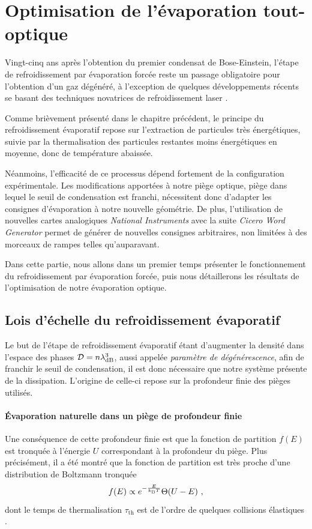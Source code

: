 \section{Optimisation de l'évaporation tout-optique}
\label{sc:evap_optique}
Vingt-cinq ans après l'obtention du premier condensat de Bose-Einstein, l'étape de refroidissement par évaporation forcée reste un passage obligatoire pour l'obtention d'un gaz dégénéré, à l'exception de quelques développements récents se basant des techniques novatrices de refroidissement laser \citep{stellmer2013laser} \citep{hu2017creation}. 

Comme brièvement présenté dans le chapitre précédent, le principe du refroidissement évaporatif repose sur l'extraction de particules très énergétiques, suivie par la thermalisation des particules restantes moins énergétiques en moyenne, donc de température abaissée.

Néanmoins, l'efficacité de ce processus dépend fortement de la configuration expérimentale. Les modifications apportées à notre piège optique, piège dans lequel le seuil de condensation est franchi, nécessitent donc d'adapter les consignes d'évaporation à notre nouvelle géométrie. De plus, l'utilisation de nouvelles cartes analogiques \emph{National Instruments} avec la suite \emph{Cicero Word Generator} permet de générer de nouvelles consignes arbitraires, non limitées à des morceaux de rampes telles qu'auparavant. 

Dans cette partie, nous allons dans un premier temps présenter le fonctionnement du refroidissement par évaporation forcée, puis nous détaillerons les résultats de l'optimisation de notre évaporation optique.


\subsection{Lois d'échelle du refroidissement évaporatif}
Le but de l'étape de refroidissement évaporatif étant d'augmenter la densité dans l'espace des phases $\mathcal{D}=n \lambda_{\mathrm{dB}}^3$, aussi appelée \emph{paramètre de dégénérescence}, afin de franchir le seuil de condensation, il est donc nécessaire que notre système présente de la dissipation. L'origine de celle-ci repose sur la profondeur finie des pièges utilisés.  

\paragraph*{Évaporation naturelle dans un piège de profondeur finie}
Une conséquence de cette profondeur finie est que la fonction de partition $f(E)$ est tronquée à l'énergie $U$ correspondant à la profondeur du piège. Plus précisément, il a été montré que la fonction de partition est très proche d'une distribution de Boltzmann tronquée
\begin{equation}
f(E)\propto e^{-\frac{E}{k_{\mathrm{B}} T}} \Theta(U-E) \text{ ,}
\label{eq:fonction_partition}
\end{equation}
dont le temps de thermalisation $\tau_{\mathrm{th}}$ est de l'ordre de quelques collisions élastiques \citep{luiten1996kinetic}. 

